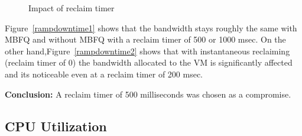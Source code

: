 \begin{figure}[h]
\centering
{}
\vspace{-1em}
\caption{Impact of reclaim timer}
\vspace{-1em}
\label{fig:reclaim}
\end{figure}

Figure~\ref{rampdowntime1} shows that the bandwidth stays roughly the same with
MBFQ and without MBFQ with a reclaim timer of 500 or 1000 msec. On the other
hand,Figure~\ref{rampdowntime2} shows that with instantaneous reclaiming
(reclaim timer of 0) the bandwidth allocated to the VM is significantly affected
and its noticeable even at a reclaim timer of 200 msec.

{\bf Conclusion:}  A reclaim timer of 500 milliseconds was chosen as a 
compromise. 

\subsection{CPU Utilization}
\label{sec:utilization}

